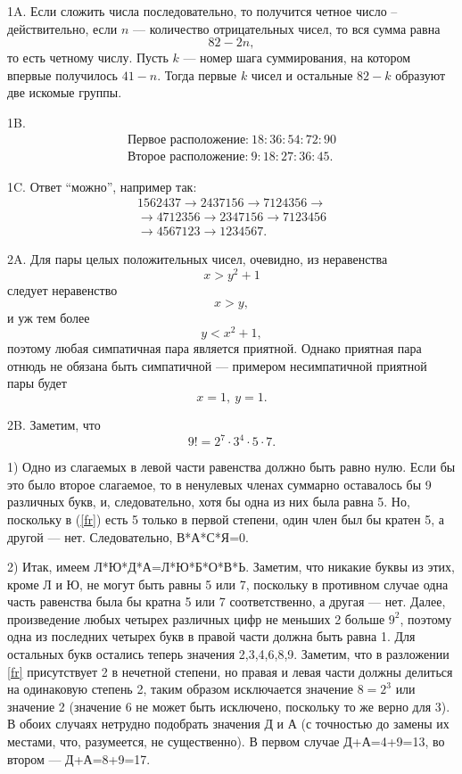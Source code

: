 \documentclass[12pt]{amsart}
\theoremstyle{definition}
\theoremstyle{remark}
\theoremstyle{plain}
\begin{document}
1A. Если сложить числа последовательно, то получится четное число -- действительно, если $n$ --- количество отрицательных чисел, то вся сумма равна
$$
82-2n,
$$
то есть четному числу. Пусть $k$ --- номер шага суммирования, на котором впервые получилось $41-n$. Тогда первые $k$ чисел и остальные $82-k$ образуют две искомые группы.

1B.
$$
\begin{array}{l}
\text{Первое расположение:}\ 18:36:54:72:90 \\
\text{Второе расположение:}\ 9:18:27:36:45.
\end{array}
$$

1C. Ответ "`можно"', например так:
$$
\begin{array}{l}
1562437\to 2437156\to 7124356\to\\
\to 4712356\to 2347156\to7123456 \\
\to 4567123\to 1234567.
\end{array}
$$

2A. Для пары целых положительных чисел, очевидно, из неравенства
$$
x>y^2+1
$$
следует неравенство
$$
x>y,
$$
и уж тем более
$$
y<x^2+1,
$$
поэтому любая симпатичная пара является приятной. Однако приятная пара отнюдь не обязана быть симпатичной --- примером несимпатичной приятной пары будет
$$
x=1,\ y=1.
$$

2B. Заметим, что 
\begin{equation}
\label{fr} 9!=2^7\cdot 3^4\cdot 5\cdot7.
\end{equation}

1) Одно из слагаемых в левой части равенства должно быть равно нулю. Если бы это было второе слагаемое, то в ненулевых членах суммарно оставалось бы 9 различных букв, и, следовательно, хотя бы одна из них была равна 5. Но, поскольку в (\ref{fr}) есть 5 только в первой степени, один член был бы кратен 5, а другой --- нет. Следовательно, В*А*С*Я=0.

2) Итак, имеем Л*Ю*Д*А=Л*Ю*Б*О*В*Ь. Заметим, что никакие буквы из этих, кроме Л и Ю, не могут быть равны 5 или 7, поскольку в противном случае одна часть равенства была бы кратна 5 или 7 соответственно, а другая --- нет. Далее, произведение любых четырех различных цифр не меньших 2 больше $9^2$, поэтому одна из последних четырех букв в правой части должна быть равна 1. Для остальных букв остались теперь значения 2,3,4,6,8,9. Заметим, что в разложении \ref{fr} присутствует 2 в нечетной степени, но правая и левая части должны делиться на одинаковую степень 2, таким образом исключается значение $8=2^3$ или значение 2 (значение 6 не может быть исключено, поскольку то же верно для 3). В обоих случаях нетрудно подобрать значения Д и А (с точностью до замены их местами, что, разумеется, не существенно). В первом случае Д+А=4+9=13, во втором --- Д+А=8+9=17.
\end{document}
